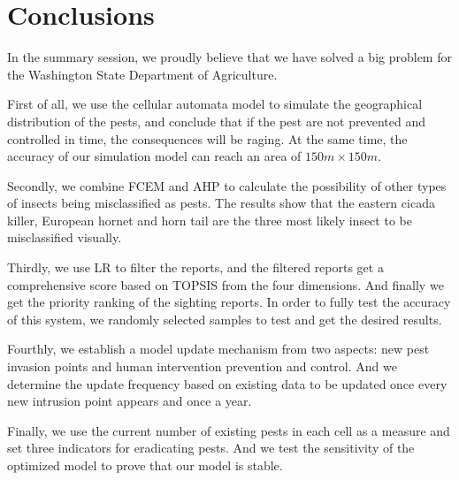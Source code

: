 \section{Conclusions}
In the summary session, we proudly believe that we have solved a big problem for the Washington State Department of Agriculture. 

First of all, we use the cellular automata model to simulate the geographical distribution of the pests, and conclude that if the pest are not prevented and controlled in time, the consequences will be raging. At the same time, the accuracy of our simulation model can reach an area of $150m \times 150m$.

Secondly, we combine FCEM and AHP to calculate the possibility of other types of insects being misclassified as pests. The results show that the eastern cicada killer, European hornet and horn tail are the three most likely insect to be misclassified visually.

Thirdly, we use LR to filter the reports, and the filtered reports get a comprehensive score based on TOPSIS from the four dimensions. And finally we get the priority ranking of the sighting reports. In order to fully test the accuracy of this system, we randomly selected samples to test and get the desired results.

Fourthly, we establish a model update mechanism from two aspects: new pest invasion points and human intervention prevention and control. And we determine the update frequency based on existing data to be updated once every new intrusion point appears and once a year. 

Finally, we use the current number of existing pests in each cell as a measure and set three indicators for eradicating pests. And we test the sensitivity of the optimized model to prove that our model is stable.

\vspace{1cm}